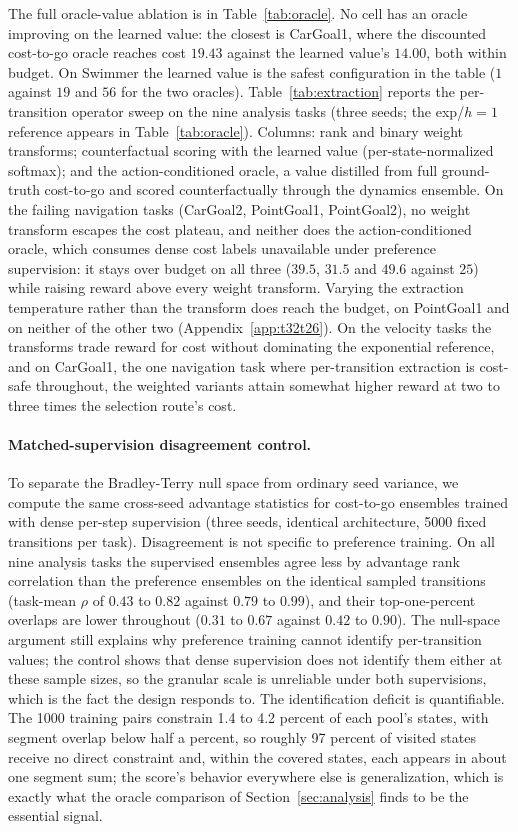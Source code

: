 \documentclass{article} %
\begin{document}
The full oracle-value ablation is in Table~\ref{tab:oracle}. No cell has an oracle improving on the learned value: the closest is CarGoal1, where the discounted cost-to-go oracle reaches cost $19.43$ against the learned value's $14.00$, both within budget. On Swimmer the learned value is the safest configuration in the table ($1$ against $19$ and $56$ for the two oracles). Table~\ref{tab:extraction} reports the per-transition operator sweep on the nine analysis tasks (three seeds; the exp/$h{=}1$ reference appears in Table~\ref{tab:oracle}). Columns: rank and binary weight transforms; counterfactual scoring with the learned value (per-state-normalized softmax); and the action-conditioned oracle, a value distilled from full ground-truth cost-to-go and scored counterfactually through the dynamics ensemble. On the failing navigation tasks (CarGoal2, PointGoal1, PointGoal2), no weight transform escapes the cost plateau, and neither does
the action-conditioned oracle, which consumes dense cost labels unavailable under preference
supervision: it stays over budget on all three ($39.5$, $31.5$ and $49.6$ against $25$) while
raising reward above every weight transform. Varying the extraction temperature rather than the transform does reach the budget, on PointGoal1 and on neither of the other two (Appendix~\ref{app:t32t26}). On the velocity tasks the transforms trade reward for cost without dominating the exponential reference, and on CarGoal1, the one navigation task where per-transition extraction is cost-safe throughout, the weighted variants attain somewhat higher reward at two to three times the selection route's cost.

\paragraph{Matched-supervision disagreement control.} To separate the Bradley-Terry null space from ordinary seed variance, we compute the same cross-seed advantage statistics for cost-to-go ensembles trained with dense per-step supervision (three seeds, identical architecture, 5000 fixed transitions per task). Disagreement is not specific to preference training. On all nine analysis tasks the supervised ensembles agree less by advantage rank correlation than the preference ensembles on the identical sampled transitions (task-mean $\rho$ of $0.43$ to $0.82$ against $0.79$ to $0.99$), and their top-one-percent overlaps are lower throughout ($0.31$ to $0.67$ against $0.42$ to $0.90$). The null-space argument still explains why preference training cannot identify per-transition values; the control shows that dense supervision does not identify them either at these sample sizes, so the granular scale is unreliable under both supervisions, which is the fact the design responds to. The identification deficit is quantifiable. The 1000 training pairs constrain 1.4 to 4.2 percent of each pool's states, with segment overlap below half a percent, so roughly 97 percent of visited states receive no direct constraint and, within the covered states, each appears in about one segment sum; the score's behavior everywhere else is generalization, which is exactly what the oracle comparison of Section~\ref{sec:analysis} finds to be the essential signal.
\end{document}
